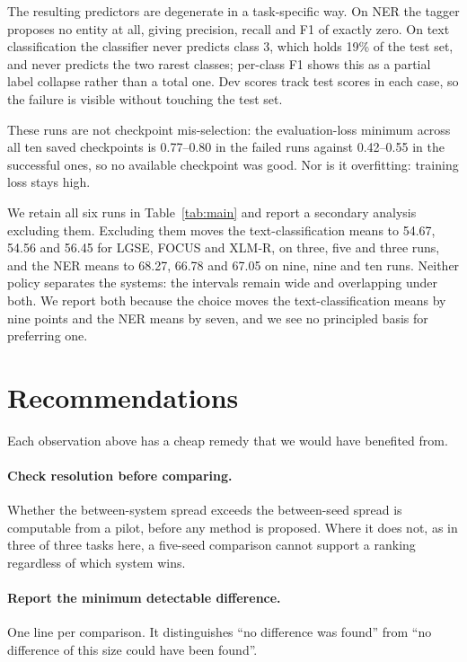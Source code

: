 \documentclass[11pt]{article}
\begin{document}
The resulting predictors are degenerate in a task-specific way. On NER the
tagger proposes no entity at all, giving precision, recall and F1 of exactly
zero. On text classification the classifier never predicts class 3, which
holds 19\% of the test set, and never predicts the two rarest classes;
per-class F1 shows this as a partial label collapse rather than a total one.
Dev scores track test scores in each case, so the failure is visible without
touching the test set.

These runs are not checkpoint mis-selection: the evaluation-loss minimum
across all ten saved checkpoints is 0.77--0.80 in the failed runs against
0.42--0.55 in the successful ones, so no available checkpoint was good. Nor
is it overfitting: training loss stays high.

We retain all six runs in Table~\ref{tab:main} and report a secondary
analysis excluding them. Excluding them moves the text-classification means
to 54.67, 54.56 and 56.45 for LGSE, FOCUS and XLM-R, on three, five and
three runs, and the NER means to 68.27, 66.78 and 67.05 on nine, nine and
ten runs. Neither policy separates the systems: the intervals remain wide
and overlapping under both. We report both because the choice moves the
text-classification means by nine points and the NER means by seven, and we
see no principled basis for preferring one.

\section{Recommendations}

Each observation above has a cheap remedy that we would have benefited from.

\paragraph{Check resolution before comparing.} Whether the between-system
spread exceeds the between-seed spread is computable from a pilot, before any
method is proposed. Where it does not, as in three of three tasks here, a
five-seed comparison cannot support a ranking regardless of which system
wins.

\paragraph{Report the minimum detectable difference.} One line per
comparison. It distinguishes ``no difference was found'' from ``no difference
of this size could have been found''.
\end{document}
